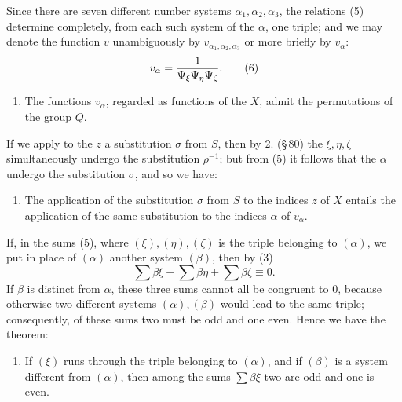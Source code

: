 \documentclass[11pt]{article}
\begin{document}
Since there are seven different number systems $\alpha_1,\alpha_2,\alpha_3$, the relations (5) determine completely, from each such system of the $\alpha$, one triple; and we may denote the function $v$ unambiguously by $v_{\alpha_1,\alpha_2,\alpha_3}$ or more briefly by $v_\alpha$:
\begin{equation}
 v_\alpha={1\over \Psi_\xi\Psi_\eta\Psi_\zeta}.
 \tag{6}
\end{equation}
\begin{enumerate}[label=\arabic*.,leftmargin=2.8em,start=3]
\item The functions $v_\alpha$, regarded as functions of the $X$, admit the permutations of the group $Q$.
\end{enumerate}
If we apply to the $z$ a substitution $\sigma$ from $S$, then by 2. (\S\,80) the $\xi,\eta,\zeta$ simultaneously undergo the substitution $\rho^{-1}$; but from (5) it follows that the $\alpha$ undergo the substitution $\sigma$, and so we have:
\begin{enumerate}[label=\arabic*.,leftmargin=2.8em,start=4]
\item The application of the substitution $\sigma$ from $S$ to the indices $z$ of $X$ entails the application of the same substitution to the indices $\alpha$ of $v_\alpha$.
\end{enumerate}

If, in the sums (5), where $(\xi),(\eta),(\zeta)$ is the triple belonging to $(\alpha)$, we put in place of $(\alpha)$ another system $(\beta)$, then by (3)
\[
 \sum\beta\xi+\sum\beta\eta+\sum\beta\zeta\equiv0.
\]
If $\beta$ is distinct from $\alpha$, these three sums cannot all be congruent to $0$, because otherwise two different systems $(\alpha),(\beta)$ would lead to the same triple; consequently, of these sums two must be odd and one even. Hence we have the theorem:
\begin{enumerate}[label=\arabic*.,leftmargin=2.8em,start=5]
\item If $(\xi)$ runs through the triple belonging to $(\alpha)$, and if $(\beta)$ is a system different from $(\alpha)$, then among the sums $\sum\beta\xi$ two are odd and one is even.
\end{enumerate}
\end{document}
